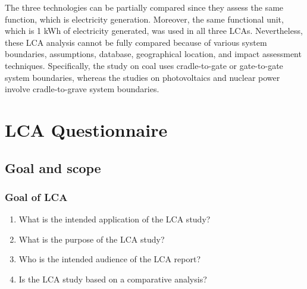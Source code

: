 \documentclass[9pt]{extarticle}
\begin{document}
The three technologies can be partially compared since they assess the same function, which is
electricity generation. Moreover, the same functional unit, which is 1 kWh of electricity
generated, was used in all three LCAs. Nevertheless, these LCA analysis cannot be fully
compared because of various system boundaries, assumptions, database, geographical
location, and impact assessment techniques. Specifically, the study on coal uses
cradle-to-gate or gate-to-gate system boundaries, whereas the studies on photovoltaics
and nuclear power involve cradle-to-grave system boundaries.

\newpage
\appendix
\section{LCA Questionnaire}
\subsection{Goal and scope}
\subsubsection{Goal of LCA}
\begin{enumerate}
    \renewcommand{\labelenumi}{\alph{enumi})}
    \item What is the intended application of the LCA study?
    \item What is the purpose of the LCA study?
    \item Who is the intended audience of the LCA report?
    \item Is the LCA study based on a comparative analysis?
\end{enumerate}
\end{document}

